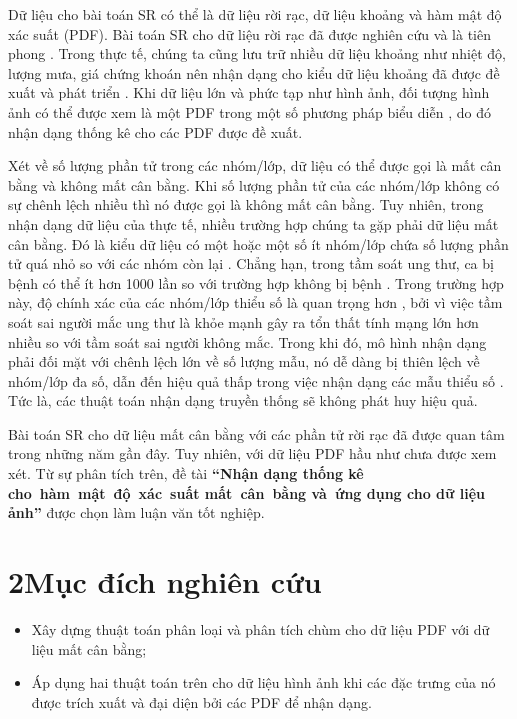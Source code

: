 \documentclass[a4paper,oneside]{book} %
\theoremstyle{plain}
\theoremstyle{plain}
\theoremstyle{nonumberplain}
\begin{document}
Dữ liệu cho bài toán SR có thể là dữ liệu rời rạc, dữ liệu khoảng và hàm mật độ xác suất (PDF). Bài toán SR cho dữ liệu rời rạc đã được nghiên cứu và là tiên phong \cite{zha2025data,cortes1995support,bezdek1984fcm}. Trong thực tế, chúng ta cũng lưu trữ nhiều dữ liệu khoảng như nhiệt độ, lượng mưa, giá chứng khoán nên nhận dạng cho kiểu dữ liệu khoảng đã được đề xuất và phát triển \cite{maia2011holt}. Khi dữ liệu lớn và phức tạp như hình ảnh, đối tượng hình ảnh có thể được xem là một PDF trong một số phương pháp biểu diễn \cite{nguyen2024new}, do đó nhận dạng thống kê cho các PDF được đề xuất. 

Xét về số lượng phần tử trong các nhóm/lớp, dữ liệu có thể được gọi là mất cân bằng và không mất cân bằng. Khi số lượng phần tử của các nhóm/lớp không có sự chênh lệch nhiều thì nó được gọi là không mất cân bằng. Tuy nhiên, trong nhận dạng dữ liệu của thực tế, nhiều trường hợp chúng ta gặp phải dữ liệu mất cân bằng.  Đó là kiểu dữ liệu có một hoặc một số ít nhóm/lớp chứa số lượng phần tử quá nhỏ so với các nhóm còn lại \cite{hu2024gat}. Chẳng hạn, trong tầm soát  ung thư, ca bị bệnh có thể ít hơn 1000 lần so với trường hợp không bị bệnh \cite{tang2008svms}. Trong trường hợp này, độ chính xác của các nhóm/lớp thiểu số là quan trọng hơn \cite{hu2024gat}, bởi vì việc tầm soát sai người mắc ung thư là khỏe mạnh gây ra tổn thất tính mạng lớn hơn nhiều so với tầm soát sai người không mắc. Trong khi đó, mô hình nhận dạng phải đối mặt với chênh lệch lớn về số lượng mẫu, nó dễ dàng bị thiên lệch về nhóm/lớp đa số, dẫn đến hiệu quả thấp trong việc nhận dạng các mẫu thiểu số \cite{nguyen2009learning}. Tức là, các thuật toán nhận dạng  truyền thống sẽ không phát huy hiệu quả.

Bài toán SR cho dữ liệu mất cân bằng với các phần tử rời rạc đã được quan tâm trong những năm gần đây. Tuy nhiên, với dữ liệu PDF hầu như chưa được xem xét. Từ sự phân tích trên, đề tài {\bf ``Nhận dạng thống kê cho~hàm~mật~độ~xác~suất mất~cân~bằng và~ứng dụng cho dữ liệu ảnh''} được chọn làm luận văn tốt nghiệp. 


\section*{2\quad Mục đích nghiên cứu}

\begin{itemize}
	\item[--] Xây dựng thuật toán phân loại và phân tích chùm cho dữ liệu PDF với dữ liệu mất cân bằng;
	\item[--] Áp dụng hai thuật toán trên cho dữ liệu hình ảnh khi các đặc trưng của nó được trích xuất và đại diện bởi các PDF để nhận dạng. 
\end{itemize}
\end{document}
